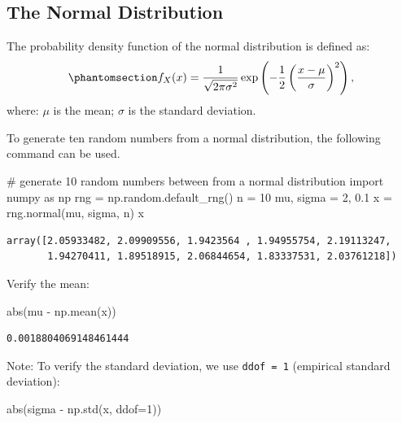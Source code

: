 \documentclass[
  letterpaper,
  DIV=11,
  numbers=noendperiod]{scrreprt}
\newenvironment{Shaded}{\begin{snugshade}}{\end{snugshade}}
\newcommand{\BuiltInTok}[1]{\textcolor[rgb]{0.00,0.23,0.31}{#1}}
\newcommand{\CommentTok}[1]{\textcolor[rgb]{0.37,0.37,0.37}{#1}}
\newcommand{\DecValTok}[1]{\textcolor[rgb]{0.68,0.00,0.00}{#1}}
\newcommand{\FloatTok}[1]{\textcolor[rgb]{0.68,0.00,0.00}{#1}}
\newcommand{\ImportTok}[1]{\textcolor[rgb]{0.00,0.46,0.62}{#1}}
\newcommand{\NormalTok}[1]{\textcolor[rgb]{0.00,0.23,0.31}{#1}}
\newcommand{\OperatorTok}[1]{\textcolor[rgb]{0.37,0.37,0.37}{#1}}
\begin{document}
\subsection{The Normal Distribution}\label{the-normal-distribution}

The probability density function of the normal distribution is defined
as: \begin{equation}\phantomsection\label{eq-normal-one}{
f_X(x) = \frac{1}{\sqrt{2\pi \sigma^2}} \exp\left(-\frac{1}{2} \left(\frac{x-\mu}{\sigma}\right)^2\right),
}\end{equation} where: \(\mu\) is the mean; \(\sigma\) is the standard
deviation.

To generate ten random numbers from a normal distribution, the following
command can be used.

\begin{Shaded}
\begin{Highlighting}[]
\CommentTok{\# generate 10 random numbers between from a normal distribution}
\ImportTok{import}\NormalTok{ numpy }\ImportTok{as}\NormalTok{ np}
\NormalTok{rng }\OperatorTok{=}\NormalTok{ np.random.default\_rng()}
\NormalTok{n }\OperatorTok{=} \DecValTok{10}
\NormalTok{mu, sigma }\OperatorTok{=} \DecValTok{2}\NormalTok{, }\FloatTok{0.1}
\NormalTok{x }\OperatorTok{=}\NormalTok{ rng.normal(mu, sigma, n)}
\NormalTok{x}
\end{Highlighting}
\end{Shaded}

\begin{verbatim}
array([2.05933482, 2.09909556, 1.9423564 , 1.94955754, 2.19113247,
       1.94270411, 1.89518915, 2.06844654, 1.83337531, 2.03761218])
\end{verbatim}

Verify the mean:

\begin{Shaded}
\begin{Highlighting}[]
\BuiltInTok{abs}\NormalTok{(mu }\OperatorTok{{-}}\NormalTok{ np.mean(x))}
\end{Highlighting}
\end{Shaded}

\begin{verbatim}
0.0018804069148461444
\end{verbatim}

Note: To verify the standard deviation, we use \texttt{ddof\ =\ 1}
(empirical standard deviation):

\begin{Shaded}
\begin{Highlighting}[]
\BuiltInTok{abs}\NormalTok{(sigma }\OperatorTok{{-}}\NormalTok{ np.std(x, ddof}\OperatorTok{=}\DecValTok{1}\NormalTok{))}
\end{Highlighting}
\end{Shaded}
\end{document}

